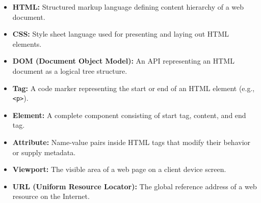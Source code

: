 \documentclass[12pt,a4paper]{article}
\begin{document}
\begin{tcolorbox}[defbox, title={\textbf{One-Line Definitions}}]
\begin{itemize}[leftmargin=*, itemsep=2pt]
  \item \textbf{HTML:} Structured markup language defining content hierarchy of a web document.
  \item \textbf{CSS:} Style sheet language used for presenting and laying out HTML elements.
  \item \textbf{DOM (Document Object Model):} An API representing an HTML document as a logical tree structure.
  \item \textbf{Tag:} A code marker representing the start or end of an HTML element (e.g., \texttt{<p>}).
  \item \textbf{Element:} A complete component consisting of start tag, content, and end tag.
  \item \textbf{Attribute:} Name-value pairs inside HTML tags that modify their behavior or supply metadata.
  \item \textbf{Viewport:} The visible area of a web page on a client device screen.
  \item \textbf{URL (Uniform Resource Locator):} The global reference address of a web resource on the Internet.
\end{itemize}
\end{tcolorbox}
\end{document}
